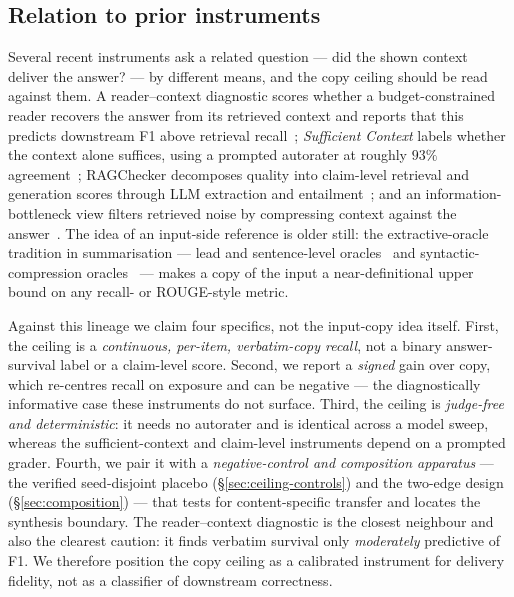 \documentclass[10pt,twocolumn]{article}
\begin{document}
\subsection{Relation to prior instruments}\label{sec:ceiling-prior}
Several recent instruments ask a related question --- did the shown context deliver the answer? --- by different means, and the copy ceiling should be read against them. A reader--context diagnostic scores whether a budget-constrained reader recovers the answer from its retrieved context and reports that this predicts downstream F1 above retrieval recall~\cite{readercontext2026}; \emph{Sufficient Context} labels whether the context alone suffices, using a prompted autorater at roughly $93\%$ agreement~\cite{sufficientcontext2025}; RAGChecker decomposes quality into claim-level retrieval and generation scores through LLM extraction and entailment~\cite{ragchecker2024}; and an information-bottleneck view filters retrieved noise by compressing context against the answer~\cite{zhu2024ibrag}. The idea of an input-side reference is older still: the extractive-oracle tradition in summarisation --- lead and sentence-level oracles~\cite{see2017pointergenerator,narayan2018xsum} and syntactic-compression oracles~\cite{xu2019extractive} --- makes a copy of the input a near-definitional upper bound on any recall- or ROUGE-style metric.

Against this lineage we claim four specifics, not the input-copy idea itself. First, the ceiling is a \emph{continuous, per-item, verbatim-copy recall}, not a binary answer-survival label or a claim-level score. Second, we report a \emph{signed} gain over copy, which re-centres recall on exposure and can be negative --- the diagnostically informative case these instruments do not surface. Third, the ceiling is \emph{judge-free and deterministic}: it needs no autorater and is identical across a model sweep, whereas the sufficient-context and claim-level instruments depend on a prompted grader. Fourth, we pair it with a \emph{negative-control and composition apparatus} --- the verified seed-disjoint placebo (\S\ref{sec:ceiling-controls}) and the two-edge design (\S\ref{sec:composition}) --- that tests for content-specific transfer and locates the synthesis boundary. The reader--context diagnostic is the closest neighbour and also the clearest caution: it finds verbatim survival only \emph{moderately} predictive of F1. We therefore position the copy ceiling as a calibrated instrument for delivery fidelity, not as a classifier of downstream correctness.
\end{document}
